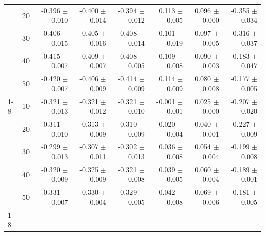 \begin{table}[t]
\begin{tabular}{llrrrrrr}
 & 20 & -0.396 $\pm$ 0.010 & -0.400 $\pm$ 0.014 & -0.394 $\pm$ 0.012 & 0.113 $\pm$ 0.005 & 0.096 $\pm$ 0.000 & -0.355 $\pm$ 0.034 \\
 & 30 & -0.406 $\pm$ 0.015 & -0.405 $\pm$ 0.016 & -0.408 $\pm$ 0.014 & 0.101 $\pm$ 0.019 & 0.097 $\pm$ 0.005 & -0.316 $\pm$ 0.037 \\
 & 40 & -0.415 $\pm$ 0.007 & -0.409 $\pm$ 0.007 & -0.408 $\pm$ 0.005 & 0.109 $\pm$ 0.008 & 0.090 $\pm$ 0.003 & -0.183 $\pm$ 0.047 \\
 & 50 & -0.420 $\pm$ 0.007 & -0.406 $\pm$ 0.009 & -0.414 $\pm$ 0.009 & 0.114 $\pm$ 0.009 & 0.080 $\pm$ 0.008 & -0.177 $\pm$ 0.005 \\
\cline{1-8}
\multirow[t]{5}{*}{VNTC--CNTT} & 10 & -0.321 $\pm$ 0.013 & -0.321 $\pm$ 0.012 & -0.321 $\pm$ 0.010 & -0.001 $\pm$ 0.001 & 0.025 $\pm$ 0.000 & -0.207 $\pm$ 0.020 \\
 & 20 & -0.311 $\pm$ 0.010 & -0.313 $\pm$ 0.009 & -0.310 $\pm$ 0.009 & 0.020 $\pm$ 0.004 & 0.040 $\pm$ 0.001 & -0.227 $\pm$ 0.009 \\
 & 30 & -0.299 $\pm$ 0.013 & -0.307 $\pm$ 0.011 & -0.302 $\pm$ 0.013 & 0.036 $\pm$ 0.008 & 0.054 $\pm$ 0.004 & -0.199 $\pm$ 0.008 \\
 & 40 & -0.320 $\pm$ 0.009 & -0.325 $\pm$ 0.009 & -0.321 $\pm$ 0.008 & 0.039 $\pm$ 0.005 & 0.060 $\pm$ 0.004 & -0.189 $\pm$ 0.001 \\
 & 50 & -0.331 $\pm$ 0.007 & -0.330 $\pm$ 0.004 & -0.329 $\pm$ 0.005 & 0.042 $\pm$ 0.008 & 0.069 $\pm$ 0.006 & -0.181 $\pm$ 0.005 \\
\cline{1-8}
\bottomrule
\end{tabular}

\end{table}

